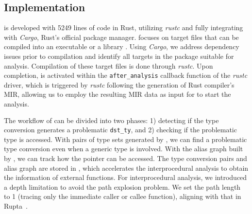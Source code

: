 \subsection{Implementation} \label{impl}
%
\TN is developed with 5249 lines of code in Rust, utilizing \textit{rustc} and fully integrating with \textit{Cargo}, Rust's official package manager. \TN focuses on target files that can be compiled into an executable or a library \cite{cargotarget54online}. Using \textit{Cargo}, we address dependency issues prior to compilation and identify all targets in the package suitable for analysis. Compilation of these target files is done through \textit{rustc}. Upon completion, \TN is activated within the \texttt{after\_analysis} callback function of the \textit{rustc} driver, which is triggered by \textit{rustc} following the generation of Rust compiler's MIR, allowing us to employ the resulting MIR data as input for \tyanalyzer to start the analysis.


The workflow of \TN{} can be divided into two phases: 1) detecting if the type conversion generates a problematic \texttt{dst\_ty}, and 2) checking if the problematic type is accessed. With pairs of type sets generated by \analysisone, we can find a problematic type conversion even when a generic type is involved. With the alias graph built by \analysistwo, we can track how the pointer can be accessed. The type conversion pairs and alias graph are stored in \pcg, which accelerates the interprocedural analysis to obtain the information of external functions. For interprocedural analysis, we introduced a depth limitation to avoid the path explosion problem. We set the path length to 1 (tracing only the immediate caller or callee function), aligning with that in Rupta~\cite{rupta}.
